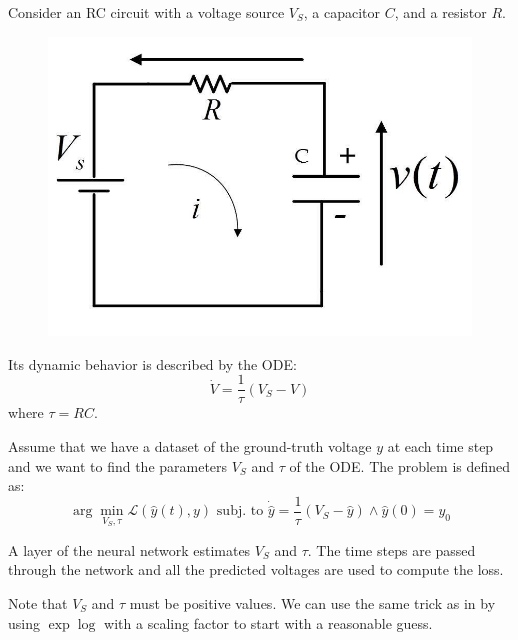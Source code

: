 \begin{description}
        \begin{example}
            Consider an RC circuit with a voltage source $V_S$, a capacitor $C$, and a resistor $R$.
            \begin{figure}[H]
                \centering
                \includegraphics[width=0.23\linewidth]{./img/rc_circuit.png}
            \end{figure}
            Its dynamic behavior is described by the ODE:
            \[ \dot{V} = \frac{1}{\tau}(V_S - V) \]
            where $\tau = RC$.

            Assume that we have a dataset of the ground-truth voltage $y$ at each time step and we want to find the parameters $V_S$ and $\tau$ of the ODE. The problem is defined as:
            \[ \arg\min_{V_S, \tau} \mathcal{L}(\hat{y}(t), y) \text{ subj. to } \dot{\hat{y}} = \frac{1}{\tau} (V_S - \hat{y}) \land \hat{y}(0) = y_0 \]

            A layer of the neural network estimates $V_S$ and $\tau$. The time steps are passed through the network and all the predicted voltages are used to compute the loss.

            Note that $V_S$ and $\tau$ must be positive values. We can use the same trick as in  by using $\exp\log$ with a scaling factor to start with a reasonable guess.
        \end{example}
\end{description}